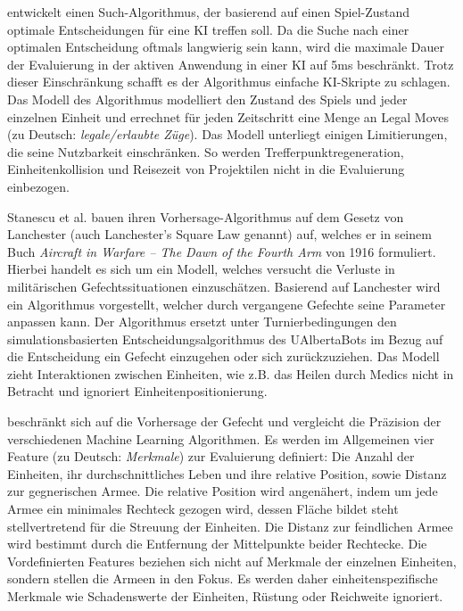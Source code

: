 \textcite{AIIDE125469} entwickelt einen Such-Algorithmus, der basierend auf einen Spiel-Zustand optimale Entscheidungen für eine KI treffen soll. Da die Suche nach einer optimalen Entscheidung oftmals langwierig sein kann, wird die maximale Dauer der Evaluierung in der aktiven Anwendung in einer KI auf 5ms beschränkt. Trotz dieser Einschränkung schafft es der Algorithmus einfache KI-Skripte zu schlagen. Das Modell des Algorithmus modelliert den Zustand des Spiels und jeder einzelnen Einheit und errechnet für jeden Zeitschritt eine Menge an Legal Moves (zu Deutsch: \textit{legale/erlaubte Züge}). Das Modell unterliegt einigen Limitierungen, die seine Nutzbarkeit einschränken. So werden Trefferpunktregeneration, Einheitenkollision und Reisezeit von Projektilen nicht in die Evaluierung einbezogen. 

Stanescu et al. \textcite{AIIDE1511531} bauen ihren Vorhersage-Algorithmus auf dem Gesetz von Lanchester (auch Lanchester's Square Law genannt) auf, welches er in seinem Buch \textit{ Aircraft in Warfare – The Dawn of the Fourth Arm} von 1916 formuliert. Hierbei handelt es sich um ein Modell, welches versucht die Verluste in militärischen Gefechtssituationen  einzuschätzen. Basierend auf Lanchester wird ein Algorithmus vorgestellt, welcher durch vergangene Gefechte seine Parameter anpassen kann. Der Algorithmus ersetzt unter Turnierbedingungen den simulationsbasierten Entscheidungsalgorithmus des UAlbertaBots im Bezug auf die Entscheidung ein Gefecht einzugehen oder sich zurückzuziehen. Das Modell zieht Interaktionen zwischen Einheiten, wie z.B. das Heilen durch Medics nicht in Betracht und ignoriert Einheitenpositionierung.  

\textcite{SnchezRuizGranados2015PredictingTO} beschränkt sich auf die Vorhersage der Gefecht und vergleicht die Präzision der verschiedenen Machine Learning Algorithmen. Es werden im Allgemeinen vier Feature (zu Deutsch: \textit{Merkmale}) zur Evaluierung definiert: Die Anzahl der Einheiten, ihr durchschnittliches Leben und ihre relative Position, sowie Distanz zur gegnerischen Armee. Die relative Position wird angenähert, indem um jede Armee ein minimales Rechteck gezogen wird, dessen Fläche bildet steht stellvertretend für die Streuung der Einheiten. Die Distanz zur feindlichen Armee wird bestimmt durch die Entfernung der Mittelpunkte beider Rechtecke. Die Vordefinierten Features beziehen sich nicht auf Merkmale der einzelnen Einheiten, sondern stellen die Armeen in den Fokus. Es werden daher einheitenspezifische Merkmale wie Schadenswerte der Einheiten, Rüstung oder Reichweite ignoriert.

